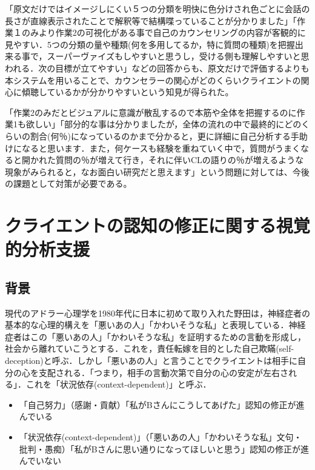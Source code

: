 \documentclass[shuuron]{kuee}
\begin{document}
「原文だけではイメージしにくい５つの分類を明快に色分けされ色ごとに会話の長さが直線表示されたことで解釈等で結構喋っていることが分かりました」「作業１のみより作業2の可視化がある事で自己のカウンセリングの内容が客観的に見やすい．5つの分類の量や種類(何を多用してるか，特に質問の種類)を把握出来る事で，スーパーヴァイズもしやすいと思うし，受ける側も理解しやすいと思われる．次の目標が立てやすい」などの回答からも、原文だけで評価するよりも本システムを用いることで、カウンセラーの関心がどのくらいクライエントの関心に傾聴しているかが分かりやすいという知見が得られた。

「作業2のみだとビジュアルに意識が散乱するので本筋や全体を把握するのに作業1も欲しい」「部分的な事は分かりましたが，全体の流れの中で最終的にどのくらいの割合(何％)になっているのかまで分かると，更に詳細に自己分析する手助けになると思います．また，何ケースも経験を重ねていく中で，質問がうまくなると開かれた質問の％が増えて行き，それに伴いCLの語りの％が増えるような現象がみられると，なお面白い研究だと思えます」という問題に対しては、今後の課題として対策が必要である。





\chapter{クライエントの認知の修正に関する視覚的分析支援}
\section{背景}


現代のアドラー心理学を1980年代に日本に初めて取り入れた野田\cite{zokad}は，神経症者の基本的な心理的構えを「悪いあの人」「かわいそうな私」と表現している．神経症者はこの「悪いあの人」「かわいそうな私」を証明するための言動を形成し，社会から離れていこうとする．これを，責任転嫁を目的とした自己欺瞞(self-deception)と呼ぶ\cite{Darshana}．しかし「悪いあの人」と言うことでクライエントは相手に自分の心を支配される．「つまり，相手の言動次第で自分の心の安定が左右される」．これを「状況依存(context-dependent)」と呼ぶ．
\begin{itemize}
  \item 「自己努力」（感謝・貢献）「私がBさんにこうしてあげた」認知の修正が進んでいる
  \item 「状況依存(context-dependent)」（「悪いあの人」「かわいそうな私」文句・批判・愚痴）「私がBさんに思い通りになってほしいと思う」認知の修正が進んでいない
\end{itemize}
\end{document}
